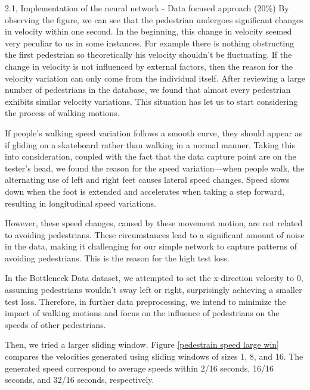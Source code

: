 \begin{task}{2.1, Implementation of the neural network - Data focused approach (20\%)}
By observing the figure, we can see that the pedestrian undergoes significant changes in velocity within one second. In the beginning, this change in velocity seemed very peculiar to us in some instances. For example there is nothing obstructing the first pedestrian so theoretically his velocity shouldn't be fluctuating. If the change in velocity is not influenced by external factors, then the reason for the velocity variation can only come from the individual itself. After reviewing a large number of pedestrians in the database, we found that almost every pedestrian exhibits similar velocity variations. This situation has let us to start considering the process of walking motions.

If people's walking speed variation follows a smooth curve, they should appear as if gliding on a skateboard rather than walking in a normal manner. Taking this into consideration, coupled with the fact that the data capture point are on the tester's head, we found the reason for the speed variation—when people walk, the alternating use of left and right feet causes lateral speed changes. Speed slows down when the foot is extended and accelerates when taking a step forward, resulting in longitudinal speed variations.

However, these speed changes, caused by these movement motion, are not related to avoiding pedestrians. These circumstances lead to a significant amount of noise in the data, making it challenging for our simple network to capture patterns of avoiding pedestrians. This is the reason for the high test loss.

In the Bottleneck Data dataset, we attempted to set the x-direction velocity to 0, assuming pedestrians wouldn't sway left or right, surprisingly achieving a smaller test loss. Therefore, in further data preprocessing, we intend to minimize the impact of walking motions and focus on the influence of pedestrians on the speeds of other pedestrians.

Then, we tried a larger sliding window. Figure \ref{pedestrain speed large win} compares the velocities generated using sliding windows of sizes 1, 8, and 16. The generated speed correspond to average speeds within 2/16 seconds, 16/16 seconds, and 32/16 seconds, respectively.


\end{task}
